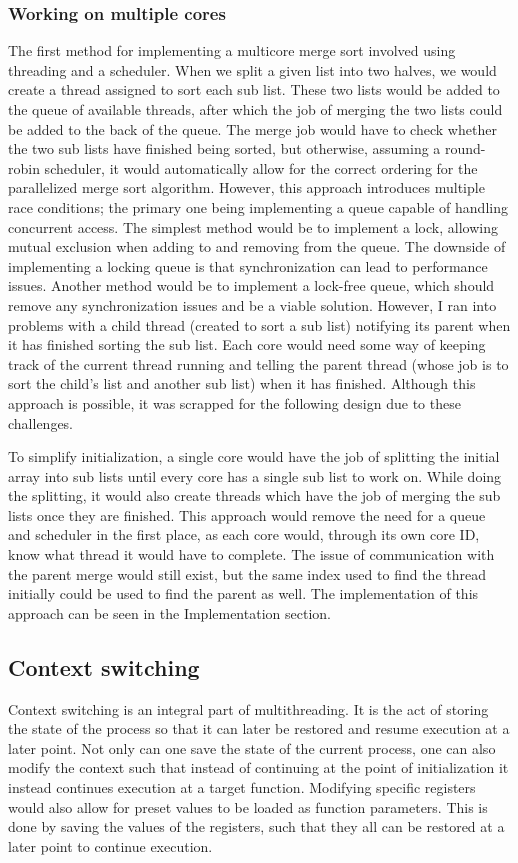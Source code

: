 \subsubsection*{Working on multiple cores}
The first method for implementing a multicore merge sort involved using
threading and a scheduler. When we split a given list into two halves, we would
create a thread assigned to sort each sub list. These two lists would be added to
the queue of available threads, after which the job of merging the two lists
could be added to the back of the queue. The merge job would have to check
whether the two sub lists have finished being sorted, but otherwise, assuming a
round-robin scheduler, it would automatically allow for the correct ordering for
the parallelized merge sort algorithm. However, this approach introduces
multiple race conditions; the primary one being implementing a queue capable of
handling concurrent access. The simplest method would be to implement a lock,
allowing mutual exclusion when adding to and removing from the queue. The
downside of implementing a locking queue is that synchronization can lead to
performance issues. Another method would be to implement a lock-free queue,
which should remove any synchronization issues and be a viable solution.
However, I ran into problems with a child thread (created to sort a sub list)
notifying its parent when it has finished sorting the sub list. Each core would
need some way of keeping track of the current thread running and telling the
parent thread (whose job is to sort the child's list and another sub list) when
it has finished. Although this approach is possible, it was scrapped for the
following design due to these challenges.

To simplify initialization, a single core would have the job of splitting the
initial array into sub lists until every core has a single sub list to work on.
While doing the splitting, it would also create threads which have the job of
merging the sub lists once they are finished. This approach would remove the need
for a queue and scheduler in the first place, as each core would, through its
own core ID, know what thread it would have to complete. The issue of
communication with the parent merge would still exist, but the same index used
to find the thread initially could be used to find the parent as well. The
implementation of this approach can be seen in the Implementation section.


\subsection{Context switching}\label{sec:context_switch}
Context switching is an integral part of multithreading. It is the act of
storing the state of the process so that it can later be restored and resume
execution at a later point. Not only can one save the state of the current
process, one can also modify the context such that instead of continuing at the
point of initialization it instead continues execution at a target function.
Modifying specific registers would also allow for preset values to be loaded as
function parameters. This is done by saving the values of the registers, such
that they all can be restored at a later point to continue execution.

